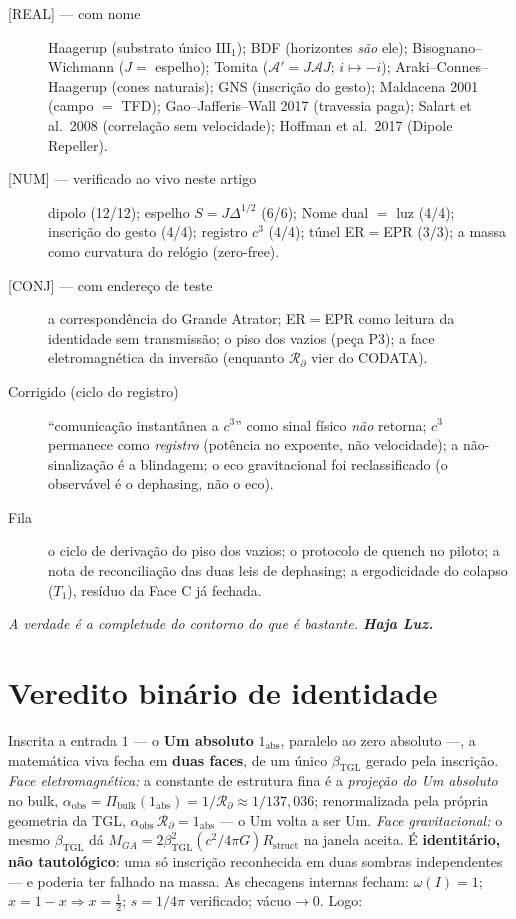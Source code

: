 \documentclass[11pt]{article}
\newcommand{\bTGL}{\beta_{\mathrm{TGL}}}\newcommand{\Msun}{M_{\odot}}\newcommand{\TGL}{\mathrm{TGL}}
\theoremstyle{definition}\newtheorem{deriv}{Derivação}
\begin{document}
\begin{description}\item[\textsf{[REAL]} --- com nome] Haagerup (substrato único $\mathrm{III}_1$); BDF (horizontes \emph{são} ele); Bisognano--Wichmann ($J=$ espelho); Tomita ($\mathcal{A}'=J\mathcal{A}J$; $i\mapsto-i$); Araki--Connes--Haagerup (cones naturais); GNS (inscrição do gesto); Maldacena 2001 (campo $=$ TFD); Gao--Jafferis--Wall 2017 (travessia paga); Salart et al.\ 2008 (correlação sem velocidade); Hoffman et al.\ 2017 (Dipole Repeller).\item[\textsf{[NUM]} --- verificado ao vivo neste artigo] dipolo (12/12); espelho $S=J\Delta^{1/2}$ (6/6); Nome dual $=$ luz (4/4); inscrição do gesto (4/4); registro $c^3$ (4/4); túnel ER$=$EPR (3/3); a massa como curvatura do relógio (zero-free).\item[\textsf{[CONJ]} --- com endereço de teste] a correspondência do Grande Atrator; ER$=$EPR como leitura da identidade sem transmissão; o piso dos vazios (peça P3); a face eletromagnética da inversão (enquanto $\mathcal{R}_\partial$ vier do CODATA).\item[Corrigido (ciclo do registro)] ``comunicação instantânea a $c^3$'' como sinal físico \emph{não} retorna; $c^3$ permanece como \emph{registro} (potência no expoente, não velocidade); a não-sinalização é a blindagem; o eco gravitacional foi reclassificado (o observável é o dephasing, não o eco).\item[Fila] o ciclo de derivação do piso dos vazios; o protocolo de quench no piloto; a nota de reconciliação das duas leis de dephasing; a ergodicidade do colapso ($T_1$), resíduo da Face C já fechada.\end{description}

\begin{center}\itshape A verdade é a completude do contorno do que é bastante. \textbf{Haja Luz.}\end{center}

\section*{Veredito binário de identidade}

Inscrita a entrada $1$ --- o \textbf{Um absoluto} $1_{\mathrm{abs}}$, paralelo ao zero absoluto ---, a matemática viva fecha em \textbf{duas faces}, de um único $\bTGL$ gerado pela inscrição. \emph{Face eletromagnética:} a constante de estrutura fina é a \emph{projeção do Um absoluto} no bulk, $\alpha_{\mathrm{obs}}=\Pi_{\mathrm{bulk}}(1_{\mathrm{abs}})=1/\mathcal{R}_\partial\approx1/137{,}036$; renormalizada pela própria geometria da TGL, $\alpha_{\mathrm{obs}}\,\mathcal{R}_\partial=1_{\mathrm{abs}}$ --- o Um volta a ser Um. \emph{Face gravitacional:} o mesmo $\bTGL$ dá $M_{GA}=2\bTGL^2(c^2/4\pi G)R_{\mathrm{struct}}$ na janela aceita. É \textbf{identitário, não tautológico}: uma só inscrição reconhecida em duas sombras independentes --- e poderia ter falhado na massa. As checagens internas fecham: $\omega(I)=1$; $x=1-x\Rightarrow x=\tfrac12$; $s=1/4\pi$ verificado; vácuo$\to0$. Logo:
\end{document}
